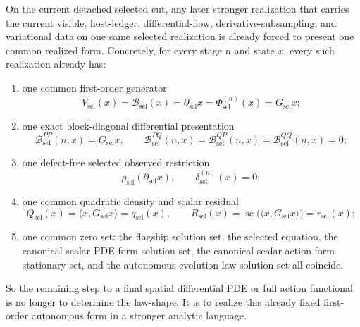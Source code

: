 \begin{theorem}
\label{thm:the-selected-cut-already-fixes-the-eventual-realized-form-up-to-differential-language}
On the current detached selected cut, any later stronger realization
that carries the current visible, host-ledger, differential-flow,
derivative-subsampling, and variational data on one same selected
realization is already forced to present one common realized form. Concretely,
for every stage \(n\) and state \(x\), every such realization already has:
\begin{enumerate}
\item one common first-order generator
\[
V_{\mathrm{sel}}(x)
 =\mathcal B_{\mathrm{sel}}(x)
 =\partial_{\mathrm{sel}}x
 =\Phi_{\mathrm{sel}}^{(n)}(x)
 =G_{\mathrm{sel}}x;
\]
\item one exact block-diagonal differential presentation
\[
\mathcal B_{\mathrm{sel}}^{PP}(n,x)=G_{\mathrm{sel}}x,\qquad
\mathcal B_{\mathrm{sel}}^{PQ}(n,x)
 =\mathcal B_{\mathrm{sel}}^{QP}(n,x)
 =\mathcal B_{\mathrm{sel}}^{QQ}(n,x)=0;
\]
\item one defect-free selected observed restriction
\[
\rho_{\mathrm{sel}}(\partial_{\mathrm{sel}}x),\qquad
\delta_{\mathrm{sel}}^{(n)}(x)=0;
\]
\item one common quadratic density and scalar residual
\[
Q_{\mathrm{sel}}(x)
 =\langle x,G_{\mathrm{sel}}x\rangle
 =q_{\mathrm{sel}}(x),\qquad
R_{\mathrm{sel}}(x)
 =\operatorname{sc}\!\bigl(\langle x,G_{\mathrm{sel}}x\rangle\bigr)
 =r_{\mathrm{sel}}(x);
\]
\item one common zero set: the flagship solution set, the selected equation,
      the canonical scalar PDE-form solution set, the canonical scalar
      action-form stationary set, and the autonomous evolution-law solution set
      all coincide.
\end{enumerate}
So the remaining step to a final spatial differential PDE or full action
functional is no longer to determine the law-shape. It is to realize this
already fixed first-order autonomous form in a stronger analytic language.
\end{theorem}

